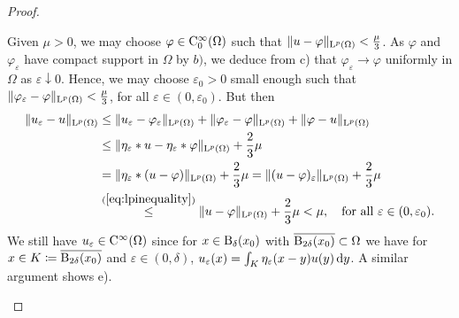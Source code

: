 \begin{proof}
\begin{enumerate}[a)]
    Given $\mu > 0$, we may choose $\varphi \in \mathrm{C}_0^\infty(\Omega)$ such that $\|u - \varphi\|_{\mathrm{L}^p(\Omega)} <  \frac{\mu}{3}$. 
    As $\varphi$ and $\varphi_\varepsilon$ have compact support in $\Omega$ by $b)$, we deduce from c) that $\varphi_\varepsilon \to \varphi$ uniformly in $\Omega$ as $\varepsilon \downarrow 0$.
    Hence, we may choose $\varepsilon_0 > 0$ small enough such that $\|\varphi_\varepsilon - \varphi\|_{\mathrm{L}^p(\Omega)} < \frac{\mu}{3}$, for all $\varepsilon \in (0, \varepsilon_0)$.
    But then
    \begin{align*}
      \|u_\varepsilon - u\|_{\mathrm{L}^p(\Omega)}
      & \leq \|u_\varepsilon - \varphi_\varepsilon \|_{\mathrm{L}^p(\Omega)} + \|\varphi_\varepsilon - \varphi\|_{\mathrm{L}^p(\Omega)} + \|\varphi - u \|_{\mathrm{L}^p(\Omega)} \\
      &\leq \|\eta_\varepsilon \ast u - \eta_\varepsilon \ast \varphi \|_{\mathrm{L}^p(\Omega)} + \frac{2}{3} \mu \\
      &= \|\eta_\varepsilon \ast (u - \varphi) \|_{\mathrm{L}^p(\Omega)} + \frac{2}{3}\mu
      = \|(u - \varphi)_\varepsilon \|_{\mathrm{L}^p(\Omega)} + \frac{2}{3}\mu \\
      &\overset{(\ref{eq:lpinequality})}{\leq} \|u-\varphi\|_{\mathrm{L}^p(\Omega)} + \frac{2}{3}\mu < \mu, \quad\text{for all } \varepsilon \in (0, \varepsilon_0).
    \end{align*}
    We still have $u_\varepsilon \in \mathrm{C}^\infty(\Omega)$ since for $x \in \mathrm{B}_\delta(x_0)$ with $\overline{\mathrm{B}_{2\delta}(x_0)} \subset \Omega$ we have for $x \in K \coloneqq \overline{\mathrm{B}_{2\delta}(x_0)}$ and $\varepsilon \in (0, \delta)$, $u_\varepsilon(x) = \int_K \eta_\varepsilon(x - y)u(y) \, {\operatorname{d}\!{y}}$.
    A similar argument shows e).\qedhere
  \end{enumerate}
\end{proof}


